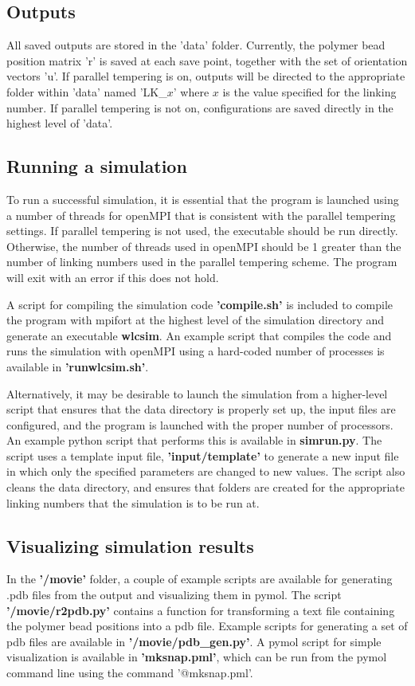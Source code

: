 \documentclass[english]{article}
\begin{document}
\begin{itemize}
\subsection{Outputs}

All saved outputs are stored in the 'data' folder. Currently, the polymer bead position matrix 'r' is saved at each save point, together with the set of orientation vectors 'u'. If parallel tempering is on, outputs will be directed to the appropriate folder within 'data' named 'LK_$x$' where $x$ is the value specified for the linking number. If parallel tempering is not on, configurations are saved directly in the highest level of 'data'.

\subsection{Running a simulation}

To run a successful simulation, it is essential that the program is launched using a number of threads for openMPI that is consistent with the parallel tempering settings. If parallel tempering is not used, the executable should be run directly. Otherwise, the number of threads used in openMPI should be 1 greater than the number of linking numbers used in the parallel tempering scheme. The program will exit with an error if this does not hold.

A script for compiling the simulation code \textbf{'compile.sh'} is included to compile the program with mpifort at the highest level of the simulation directory and generate an executable \textbf{wlcsim}. An example script that compiles the code and runs the simulation with openMPI using a hard-coded number of processes is available in \textbf{'runwlcsim.sh'}.

Alternatively, it may be desirable to launch the simulation from a higher-level script that ensures that the data directory is properly set up, the input files are configured, and the program is launched with the proper number of processors. An example python script that performs this is available in \textbf{simrun.py}. The script uses a template input file, \textbf{'input/template'} to generate a new input file in which only the specified parameters are changed to new values. The script also cleans the data directory, and ensures that folders are created for the appropriate linking numbers that the simulation is to be run at.

\subsection{Visualizing simulation results}
In the \textbf{'/movie'} folder, a couple of example scripts are available for generating .pdb files from the output and visualizing them in pymol. The script \textbf{'/movie/r2pdb.py'} contains a function for transforming a text file containing the polymer bead positions into a pdb file. Example scripts for generating a set of pdb files are available in \textbf{'/movie/pdb_gen.py'}. A pymol script for simple visualization is available in \textbf{'mksnap.pml'}, which can be run from the pymol command line using the command '@mksnap.pml'.


\end{itemize}
\end{document}
